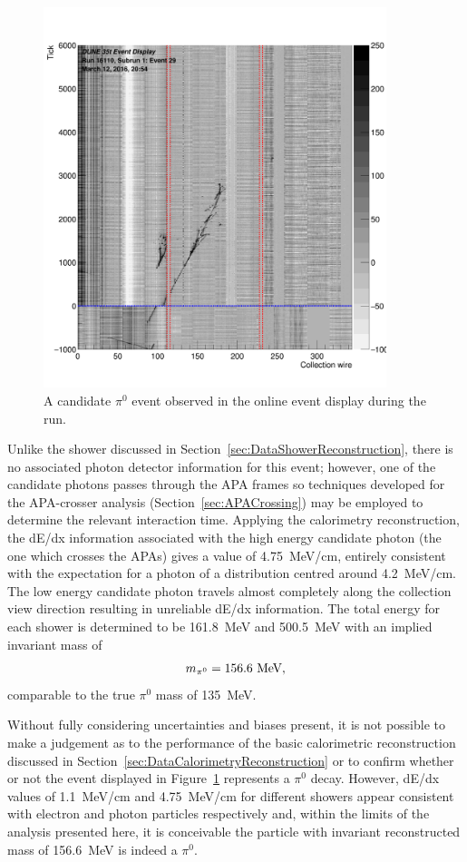 \begin{figure}
  \centering
  \includegraphics[width=10cm]{evd_run16110_subrun1_event29.png}
  \caption[A candidate $\pi^0$ event observed in the online event display during the run.]{A candidate $\pi^0$ event observed in the online event display during the run.}
  \label{fig:DataPi0Candidate}
\end{figure}
Unlike the shower discussed in Section~\ref{sec:DataShowerReconstruction}, there is no associated photon detector information for this event; however, one of the candidate photons passes through the APA frames so techniques developed for the APA-crosser analysis (Section~\ref{sec:APACrossing}) may be employed to determine the relevant interaction time.  Applying the calorimetry reconstruction, the dE/dx information associated with the high energy candidate photon (the one which crosses the APAs) gives a value of 4.75~MeV/cm, entirely consistent with the expectation for a photon of a distribution centred around 4.2~MeV/cm.  The low energy candidate photon travels almost completely along the collection view direction resulting in unreliable dE/dx information.  The total energy for each shower is determined to be 161.8~MeV and 500.5~MeV with an implied invariant mass of
\begin{equation}\label{eq:DataPi0CandidateMass}
m_{\pi^0} = 156.6~\textnormal{MeV},
\end{equation}
comparable to the true $\pi^0$ mass of 135~MeV.

Without fully considering uncertainties and biases present, it is not possible to make a judgement as to the performance of the basic calorimetric reconstruction discussed in Section~\ref{sec:DataCalorimetryReconstruction} or to confirm whether or not the event displayed in Figure~\ref{fig:DataPi0Candidate} represents a $\pi^0$ decay.  However, dE/dx values of 1.1~MeV/cm and 4.75~MeV/cm for different showers appear consistent with electron and photon particles respectively and, within the limits of the analysis presented here, it is conceivable the particle with invariant reconstructed mass of 156.6~MeV is indeed a $\pi^0$.


